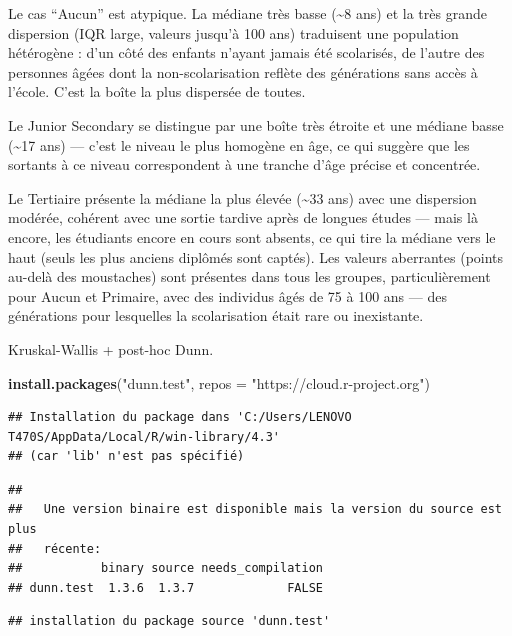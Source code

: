 \documentclass[
]{article}
\newenvironment{Shaded}{\begin{snugshade}}{\end{snugshade}}
\newcommand{\AttributeTok}[1]{\textcolor[rgb]{0.13,0.29,0.53}{#1}}
\newcommand{\FunctionTok}[1]{\textcolor[rgb]{0.13,0.29,0.53}{\textbf{#1}}}
\newcommand{\NormalTok}[1]{#1}
\newcommand{\StringTok}[1]{\textcolor[rgb]{0.31,0.60,0.02}{#1}}
\begin{document}
Le cas ``Aucun'' est atypique. La médiane très basse (\textasciitilde8
ans) et la très grande dispersion (IQR large, valeurs jusqu'à 100 ans)
traduisent une population hétérogène : d'un côté des enfants n'ayant
jamais été scolarisés, de l'autre des personnes âgées dont la
non-scolarisation reflète des générations sans accès à l'école. C'est la
boîte la plus dispersée de toutes.

Le Junior Secondary se distingue par une boîte très étroite et une
médiane basse (\textasciitilde17 ans) --- c'est le niveau le plus
homogène en âge, ce qui suggère que les sortants à ce niveau
correspondent à une tranche d'âge précise et concentrée.

Le Tertiaire présente la médiane la plus élevée (\textasciitilde33 ans)
avec une dispersion modérée, cohérent avec une sortie tardive après de
longues études --- mais là encore, les étudiants encore en cours sont
absents, ce qui tire la médiane vers le haut (seuls les plus anciens
diplômés sont captés). Les valeurs aberrantes (points au-delà des
moustaches) sont présentes dans tous les groupes, particulièrement pour
Aucun et Primaire, avec des individus âgés de 75 à 100 ans --- des
générations pour lesquelles la scolarisation était rare ou inexistante.

Kruskal-Wallis + post-hoc Dunn.

\begin{Shaded}
\begin{Highlighting}[]
\FunctionTok{install.packages}\NormalTok{(}\StringTok{"dunn.test"}\NormalTok{, }\AttributeTok{repos =} \StringTok{"https://cloud.r{-}project.org"}\NormalTok{)}
\end{Highlighting}
\end{Shaded}

\begin{verbatim}
## Installation du package dans 'C:/Users/LENOVO T470S/AppData/Local/R/win-library/4.3'
## (car 'lib' n'est pas spécifié)
\end{verbatim}

\begin{verbatim}
## 
##   Une version binaire est disponible mais la version du source est plus
##   récente:
##           binary source needs_compilation
## dunn.test  1.3.6  1.3.7             FALSE
\end{verbatim}

\begin{verbatim}
## installation du package source 'dunn.test'
\end{verbatim}
\end{document}
